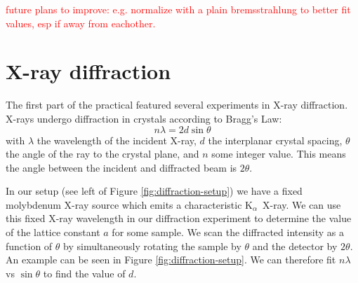 \documentclass[11pt,a4paper,twoside,onecolumn]{article}
\newcommand{\reminder}[1]{\textcolor{red}{#1}}
\newcommand{\Kalpha}{$\mathrm{K}_\alpha$~}
\begin{document}
\reminder{future plans to improve: e.g. normalize with a plain bremsstrahlung to better fit values, esp if away from eachother.}




\newpage
\appendix
\renewcommand\thesection{Appendix \Alph{section}}
\renewcommand{\thetable}{\Alph{section}\arabic{table}}
\setcounter{table}{0}
\renewcommand{\thefigure}{\Alph{section}\arabic{figure}}
\setcounter{figure}{0}
\renewcommand{\sectionmark}[1]{\markboth{\thesection.\ #1}{}}

\section{X-ray diffraction}\label{sec:diffraction-experiment}
The first part of the practical featured several experiments in X-ray diffraction. X-rays undergo diffraction in crystals according to Bragg's Law:
\begin{equation}
    n \lambda = 2 d \sin \theta
\end{equation}
with $\lambda$ the wavelength of the incident X-ray, $d$ the interplanar crystal spacing, $\theta$ the angle of the ray to the crystal plane, and $n$ some integer value. This means the angle between the incident and diffracted beam is $2 \theta$.

In our setup (see left of Figure \ref{fig:diffraction-setup}) we have a fixed molybdenum X-ray source which emits a characteristic \Kalpha X-ray. We can use this fixed X-ray wavelength in our diffraction experiment to determine the value of the lattice constant $a$ for some sample. We scan the diffracted intensity as a function of $\theta$ by simultaneously rotating the sample by $\theta$ and the detector by $2\theta$. An example can be seen in Figure \ref{fig:diffraction-setup}. We can therefore fit $n \lambda$ vs $\sin \theta$ to find the value of $d$.
\end{document}
